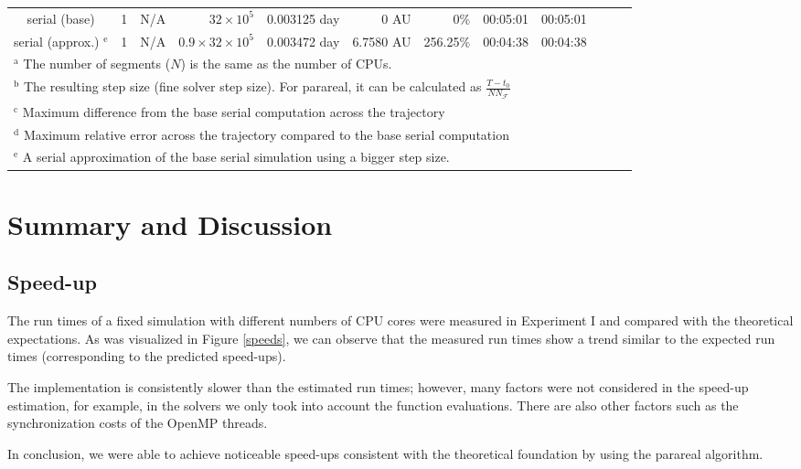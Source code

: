 \documentclass[conference]{IEEEtran}
\begin{document}
\begin{table*}[htbp]
\begin{center}
\begin{tabular}{crrrrrrrrrcc}
serial (base) & 1 & N/A & $32\times10^5$ & 0.003125 day & 0 AU & 0\% & 00:05:01 & 00:05:01 \\
serial (approx.) $^{\mathrm{e}}$ & 1 & N/A & $0.9\times32\times10^5$ & 0.003472 day & 6.7580 AU & 256.25\% & 00:04:38 & 00:04:38 \\
\bottomrule
\multicolumn{8}{l}{$^{\mathrm{a}}$ The number of segments ($N$) is the same as the number of CPUs.} \\
\multicolumn{8}{l}{$^{\mathrm{b}}$ The resulting step size (fine solver step size). For parareal, it can be calculated as $\frac{T-t_0}{NN_\mathcal{F}}$} \\
\multicolumn{8}{l}{$^{\mathrm{c}}$ Maximum difference from the base serial computation across the trajectory} \\
\multicolumn{8}{l}{$^{\mathrm{d}}$ Maximum relative error across the trajectory compared to the base serial computation} \\
\multicolumn{8}{l}{$^{\mathrm{e}}$ A serial approximation of the base serial simulation using a bigger step size.}
\end{tabular}
\label{runtimes}
\end{center}
\end{table*}

\section{Summary and Discussion}

\subsection{Speed-up}
The run times of a fixed simulation with different numbers of CPU cores were measured in Experiment I and compared with the theoretical expectations. As was visualized in Figure \ref{speeds}, we can observe that the measured run times show a trend similar to the expected run times (corresponding to the predicted speed-ups). 

The implementation is consistently slower than the estimated run times; however, many factors were not considered in the speed-up estimation, for example, in the solvers we only took into account the function evaluations. There are also other factors such as the synchronization costs of the OpenMP threads.

In conclusion, we were able to achieve noticeable speed-ups consistent with the theoretical foundation by using the parareal algorithm.
\end{document}
